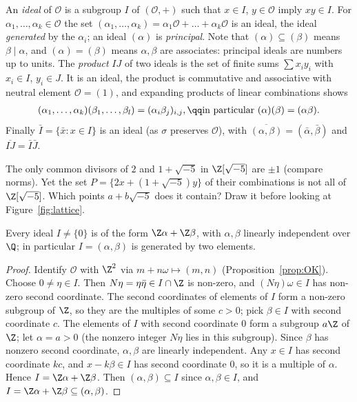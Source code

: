 An \emph{ideal} of $\mathcal O$ is a subgroup $I$ of $(\mathcal O,+)$ such that $x\in I$, $y\in\mathcal O$ imply $xy\in I$. For $\alpha_1,\dots,\alpha_k\in\mathcal O$ the set $(\alpha_1,\dots,\alpha_k)=\alpha_1\mathcal O+\dots+\alpha_k\mathcal O$ is an ideal, the ideal \emph{generated} by the $\alpha_i$; an ideal $(\alpha)$ is \emph{principal}. Note that $(\alpha)\subseteq(\beta)$ means $\beta\mid\alpha$, and $(\alpha)=(\beta)$ means $\alpha,\beta$ are associates: principal ideals are numbers up to units. The \emph{product} $IJ$ of two ideals is the set of finite sums $\sum x_iy_i$ with $x_i\in I$, $y_i\in J$. It is an ideal, the product is commutative and associative with neutral element $\mathcal O=(1)$, and expanding products of linear combinations shows
\[
\begin{gathered}(\alpha_1,\dots,\alpha_k)(\beta_1,\dots,\beta_l)=(\alpha_i\beta_j)_{i,j},\qq\text{in particular }(\alpha)(\beta)=(\alpha\beta).\end{gathered}
\]
Finally $\bar I=\{\bar x:x\in I\}$ is an ideal (as $\sigma$ preserves $\mathcal O$), with $\overline{(\alpha,\beta)}=(\bar\alpha,\bar\beta)$ and $\overline{IJ}=\bar I\bar J$.

\begin{think}
The only common divisors of $2$ and $1+\sqrt{-5}$ in $\Z[\sqrt{-5}]$ are $\pm1$ (compare norms). Yet the set $P=\{2x+(1+\sqrt{-5})y\}$ of their combinations is not all of $\Z[\sqrt{-5}]$. Which points $a+b\sqrt{-5}$ does it contain? Draw it before looking at Figure~\ref{fig:lattice}.
\end{think}

\begin{lemma}\label{lem:twogen}
Every ideal $I\ne\{0\}$ is of the form $\Z\alpha+\Z\beta$, with $\alpha,\beta$ linearly independent over $\Q$; in particular $I=(\alpha,\beta)$ is generated by two elements.
\end{lemma}
\begin{proof}
Identify $\mathcal O$ with $\Z^2$ via $m+n\omega\mapsto(m,n)$ (Proposition~\ref{prop:OK}). Choose $0\ne\eta\in I$. Then $N\eta=\eta\bar\eta\in I\cap\Z$ is non-zero, and $(N\eta)\omega\in I$ has non-zero second coordinate. The second coordinates of elements of $I$ form a non-zero subgroup of $\Z$, so they are the multiples of some $c>0$; pick $\beta\in I$ with second coordinate $c$. The elements of $I$ with second coordinate $0$ form a subgroup $a\Z$ of $\Z$; let $\alpha=a>0$ (the nonzero integer $N\eta$ lies in this subgroup). Since $\beta$ has nonzero second coordinate, $\alpha,\beta$ are linearly independent. Any $x\in I$ has second coordinate $kc$, and $x-k\beta\in I$ has second coordinate $0$, so it is a multiple of $\alpha$. Hence $I=\Z\alpha+\Z\beta$. Then $(\alpha,\beta)\subseteq I$ since $\alpha,\beta\in I$, and $I=\Z\alpha+\Z\beta\subseteq(\alpha,\beta)$.
\end{proof}

